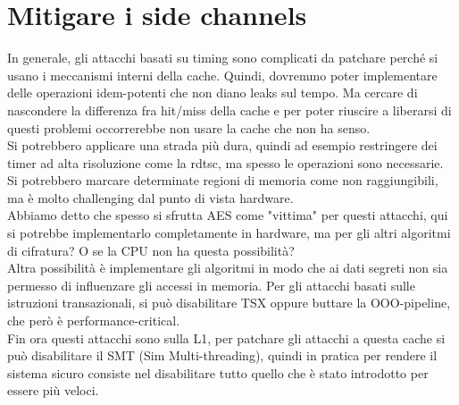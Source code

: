 \documentclass[12pt, oneside]{extbook} %
\begin{document}
\section{Mitigare i side channels}
In generale, gli attacchi basati su timing sono complicati da patchare perché si usano i meccanismi interni della cache. Quindi, dovremmo poter implementare delle operazioni idem-potenti che non diano leaks sul tempo. Ma cercare di nascondere la differenza fra hit/miss della cache e per poter riuscire a liberarsi di questi problemi occorrerebbe non usare la cache che non ha senso.\\ Si potrebbero applicare una strada più dura, quindi ad esempio restringere dei timer ad alta risoluzione come la rdtsc, ma spesso le operazioni sono necessarie. Si potrebbero marcare determinate regioni di memoria come non raggiungibili, ma è molto challenging dal punto di vista hardware.\\ Abbiamo detto che spesso si sfrutta AES come "vittima" per questi attacchi, qui si potrebbe implementarlo completamente in hardware, ma per gli altri algoritmi di cifratura? O se la CPU non ha questa possibilità?\\ Altra possibilità è implementare gli algoritmi in modo che ai dati segreti non sia permesso di influenzare gli accessi in memoria. Per gli attacchi basati sulle istruzioni transazionali, si può disabilitare TSX oppure buttare la OOO-pipeline, che però è performance-critical.\\ Fin ora questi attacchi sono sulla L1, per patchare gli attacchi a questa cache si può disabilitare il SMT (Sim Multi-threading), quindi in pratica per rendere il sistema sicuro consiste nel disabilitare tutto quello che è stato introdotto per essere più veloci.
\end{document}

